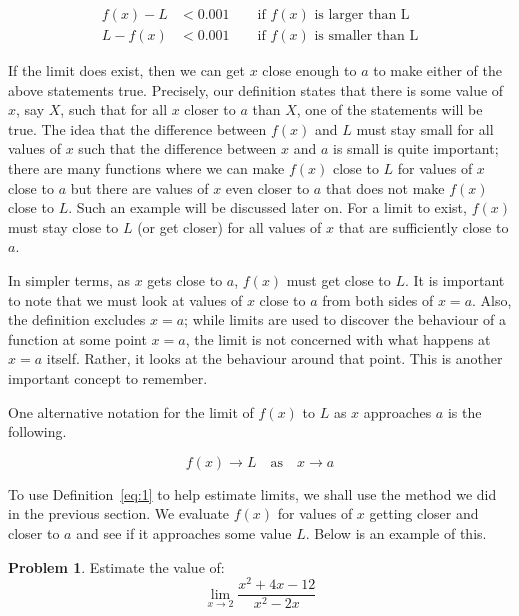 \documentclass[12pt]{article}
\theoremstyle{definition}
\newtheorem{problem}{Problem}
\begin{document}
\begin{align*}
    f(x) - L & < 0.001 \qquad \text{if } f(x) \text{ is larger than L}  \\
    L - f(x) & < 0.001 \qquad \text{if } f(x) \text{ is smaller than L}
\end{align*}

If the limit does exist, then we can get $x$ close enough to $a$ to make either of the above statements true.
Precisely, our definition states that there is some value of $x$, say $X$, such that for all $x$ closer to $a$ than $X$, one of the statements will be true.
The idea that the difference between $f(x)$ and $L$ must stay small for all values of $x$ such that the difference between $x$ and $a$ is small is quite important; there are many functions where we can make $f(x)$ close to $L$ for values of $x$ close to $a$ but there are values of $x$ even closer to $a$ that does not make $f(x)$ close to $L$.
Such an example will be discussed later on.
For a limit to exist, $f(x)$ must stay close to $L$ (or get closer) for all values of $x$ that are sufficiently close to $a$.

In simpler terms, as $x$ gets close to $a$, $f(x)$ must get close to $L$.
It is important to note that we must look at values of $x$ close to $a$ from both sides of $x=a$.
Also, the definition excludes $x=a$; while limits are used to discover the behaviour of a function at some point $x=a$, the limit is not concerned with what happens at $x=a$ itself.
Rather, it looks at the behaviour around that point.
This is another important concept to remember.

One alternative notation for the limit of $f(x)$ to $L$ as $x$ approaches $a$ is the following.

\begin{equation}
    f(x) \to L \quad \text{as} \quad x \to a
\end{equation}

To use Definition~\eqref{eq:1} to help estimate limits, we shall use the method we did in the previous section.
We evaluate $f(x)$ for values of $x$ getting closer and closer to $a$ and see if it approaches some value $L$.
Below is an example of this.

\begin{problem}
Estimate the value of:
\begin{equation*}
    \lim_{x \to 2} \frac{x^2+4x-12}{x^2-2x} \label{eq:2}
\end{equation*}
\end{problem}
\end{document}
